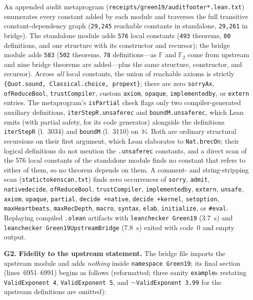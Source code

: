 \documentclass[11pt,reqno]{amsart}
\theoremstyle{remark}
\newcommand{\F}{\mathbb{F}}
\newcommand{\N}{\mathbb{N}}
\newcommand{\LeanUS}{\textunderscore\hspace{0pt}}
\newcommand{\lean}[1]{{\let\_\LeanUS\texttt{#1}}}
\begin{document}
An appended audit metaprogram (\lean{receipts/\allowbreak{}green19/\allowbreak{}audit\_footer\_*.lean.\allowbreak{}txt}) enumerates every constant added by each module and traverses the full transitive constant-dependency graph (\lean{29,245} reachable constants in standalone, \lean{29,261} in bridge). The standalone module adds \lean{576} local constants (\lean{493} theorems, \lean{80} definitions, and one structure with its constructor and recursor); the bridge module adds \lean{583} (\lean{502} theorems, \lean{78} definitions---as $\F$ and $\F_2$ come from upstream and nine bridge theorems are added---plus the same structure, constructor, and recursor). Across \emph{all} local constants, the union of reachable axioms is strictly \lean{\{Quot.\allowbreak{}sound, Classical.\allowbreak{}choice, propext\}}; there are zero \lean{sorryAx}, \lean{ofReduceBool}, \lean{trustCompiler}, custom \lean{axiom}, \lean{opaque}, \lean{implemented\_by}, or \lean{extern} entries. The metaprogram's \lean{isPartial} check flags only two compiler-generated auxiliary definitions, \lean{iterStepR.\allowbreak{}\_unsafe\_rec} and \lean{boundM.\allowbreak{}\_unsafe\_rec}, which Lean emits (with partial safety, for its code generator) alongside the definitions \lean{iterStepR} (l.~3034) and \lean{boundM} (l.~3110) on~$\N$. Both are ordinary structural recursions on their first argument, which Lean elaborates to \lean{Nat.\allowbreak{}brecOn}; their logical definitions do not mention the \lean{.\_unsafe\_rec} constants, and a direct scan of the 576 local constants of the standalone module finds no constant that refers to either of them, so no theorem depends on them. A comment- and string-stripping scan (\lean{static\_token\_scan.\allowbreak{}txt}) finds zero occurrences of \lean{sorry}, \lean{admit}, \lean{native\_decide}, \lean{ofReduceBool}, \lean{trustCompiler}, \lean{implemented\_by}, \lean{extern}, \lean{unsafe}, \lean{axiom}, \lean{opaque}, \lean{partial}, \lean{decide +native}, \lean{decide +kernel}, \lean{set\_option}, \lean{maxHeartbeats}, \lean{maxRecDepth}, \lean{macro}, \lean{syntax}, \lean{elab}, \lean{initialize}, or \lean{\#eval}. Replaying compiled \lean{.olean} artifacts with \lean{leanchecker Green19} (3.7~s) and \lean{leanchecker Green19\_UpstreamBridge} (7.8~s) exited with code~0 and empty output.

\medskip
\noindent\textbf{G2. Fidelity to the upstream statement.} The bridge file imports the upstream module and adds \emph{nothing} inside \lean{namespace Green19}; its final section (lines~6951--6991) begins as follows (reformatted; three sanity \lean{example}s restating \lean{ValidExponent 4}, \lean{ValidExponent 5}, and $\neg$\,\lean{ValidExponent 3.99} for the upstream definitions are omitted):
\end{document}

